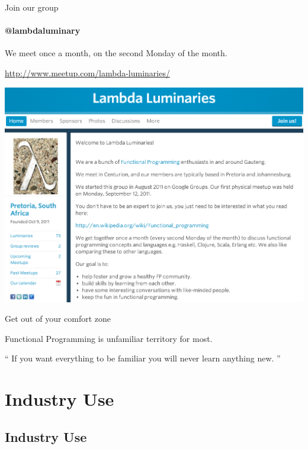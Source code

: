 \documentclass[mathserif]{beamer}
\begin{document}
\begin{frame}{Join our group}
  \framesubtitle{@lambdaluminary}
  We meet once a month, on the second Monday of the month.

  \url{http://www.meetup.com/lambda-luminaries/}
  \begin{center}
    \includegraphics[scale=0.2]{img/ScreenShotLambdaLuminaries.png}
  \end{center}
\end{frame}

\begin{frame}{Get out of your comfort zone}

  {\Large Functional Programming is unfamiliar territory for most.}

\begin{exampleblock}{}
  {\Large ``
    If you want everything to be familiar you will never learn anything new.
  ''}
  \vskip5mm
  \hspace*{}
\end{exampleblock}

\end{frame}

\section{Industry Use}
\subsection{Industry Use}
\end{document}
